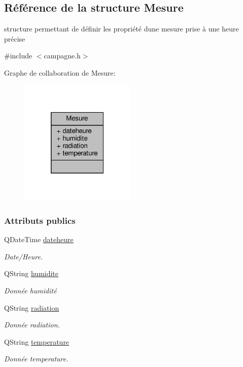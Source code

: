 \hypertarget{struct_mesure}{}\subsection{Référence de la structure Mesure}
\label{struct_mesure}


structure permettant de définir les propriété d\textquotesingle{}une mesure prise à une heure précise  




{\ttfamily \#include $<$campagne.\+h$>$}



Graphe de collaboration de Mesure\+:\nopagebreak
\begin{figure}[H]
\begin{center}
\leavevmode
\includegraphics[width=157pt]{struct_mesure__coll__graph}
\end{center}
\end{figure}
\subsubsection*{Attributs publics}
\begin{DoxyCompactItemize}
\item 
Q\+Date\+Time \hyperlink{struct_mesure_a9958b0440aca6af40028e742123afd9e}{dateheure}
\begin{DoxyCompactList}\small\item\em Date/\+Heure. \end{DoxyCompactList}\item 
Q\+String \hyperlink{struct_mesure_ad354ba4d8a32c05600859c76a8af0282}{humidite}
\begin{DoxyCompactList}\small\item\em Donnée humidité \end{DoxyCompactList}\item 
Q\+String \hyperlink{struct_mesure_a1dae237cf09302d426ea375b9afb12f7}{radiation}
\begin{DoxyCompactList}\small\item\em Donnée radiation. \end{DoxyCompactList}\item 
Q\+String \hyperlink{struct_mesure_ad0dba8933e4b65b3781be7811f0f86ac}{temperature}
\begin{DoxyCompactList}\small\item\em Donnée temperature. \end{DoxyCompactList}\end{DoxyCompactItemize}


